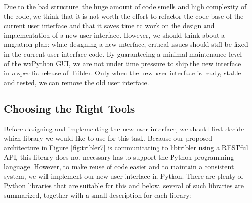 \noindent Due to the bad structure, the huge amount of code smells and high complexity of the code, we think that it is not worth the effort to refactor the code base of the current user interface and that it saves time to work on the design and implementation of a new user interface. However, we should think about a migration plan: while designing a new interface, critical issues should still be fixed in the current user interface code. By guaranteeing a minimal maintenance level of the wxPython GUI, we are not under time pressure to ship the new interface in a specific release of Tribler. Only when the new user interface is ready, stable and tested, we can remove the old user interface.

\subsection{Choosing the Right Tools}
Before designing and implementing the new user interface, we should first decide which library we would like to use for this task. Because our proposed architecture in Figure \ref{fig:tribler7} is communicating to libtribler using a RESTful API, this library does not necessary has to support the Python programming language. However, to make reuse of code easier and to maintain a consistent system, we will implement our new user interface in Python. There are plenty of Python libraries that are suitable for this and below, several of such libraries are summarized, together with a small description for each library:
